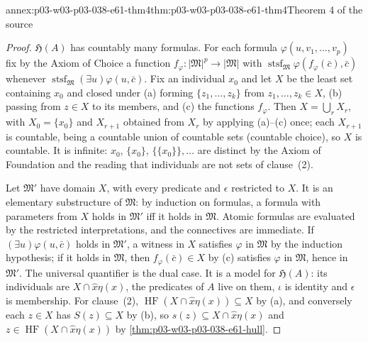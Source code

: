 \begin{annexitem}{annex:p03-w03-p03-038-e61-thm4}{thm:p03-w03-p03-038-e61-thm4}{Theorem 4 of the source}
\begin{proof}
\(\mathfrak H(A)\) has countably many formulas. For each formula
\(\varphi(u,v_1,\ldots,v_p)\) fix by the Axiom of Choice a function
\(f_\varphi:|\mathfrak M|^p\to|\mathfrak M|\) with
\(\operatorname{stsf}_{\mathfrak M}\varphi(f_\varphi(\bar c),\bar c)\)
whenever \(\operatorname{stsf}_{\mathfrak M}(\exists u)\varphi(u,\bar c)\).
Fix an individual \(x_0\) and let \(X\) be the least set containing \(x_0\)
and closed under (a) forming \(\{z_1,\ldots,z_k\}\) from
\(z_1,\ldots,z_k\in X\), (b) passing from \(z\in X\) to its members, and
(c) the functions \(f_\varphi\). Then \(X=\bigcup_rX_r\), with
\(X_0=\{x_0\}\) and \(X_{r+1}\) obtained from \(X_r\) by applying (a)--(c)
once; each \(X_{r+1}\) is countable, being a countable union of countable
sets (countable choice), so \(X\) is countable. It is infinite: \(x_0\),
\(\{x_0\}\), \(\{\{x_0\}\},\ldots\) are distinct by the Axiom of
Foundation and the reading that individuals are not sets of clause~(2).

Let \(\mathfrak M'\) have domain \(X\), with every predicate and \(\epsilon\)
restricted to \(X\). It is an elementary substructure of \(\mathfrak M\): by induction on
formulas, a formula with parameters from \(X\) holds in \(\mathfrak M'\)
iff it holds in \(\mathfrak M\). Atomic formulas are evaluated by the
restricted interpretations, and the connectives are immediate. If
\((\exists u)\varphi(u,\bar c)\) holds in \(\mathfrak M'\), a witness in
\(X\) satisfies \(\varphi\) in \(\mathfrak M\) by the induction hypothesis;
if it holds in \(\mathfrak M\), then \(f_\varphi(\bar c)\in X\) by (c)
satisfies \(\varphi\) in \(\mathfrak M\), hence in \(\mathfrak M'\). The
universal quantifier is the dual case. It is a model for \(\mathfrak H(A)\): its
individuals are \(X\cap\hat x\eta(x)\), the predicates of \(A\) live on
them, \(\iota\) is identity and \(\epsilon\) is membership. For clause~(2),
\(\operatorname{HF}(X\cap\hat x\eta(x))\subseteq X\) by (a), and conversely
each \(z\in X\) has \(S(z)\subseteq X\) by (b), so
\(s(z)\subseteq X\cap\hat x\eta(x)\) and
\(z\in\operatorname{HF}(X\cap\hat x\eta(x))\) by
\cref{thm:p03-w03-p03-038-e61-hull}.
\end{proof}
\end{annexitem}

